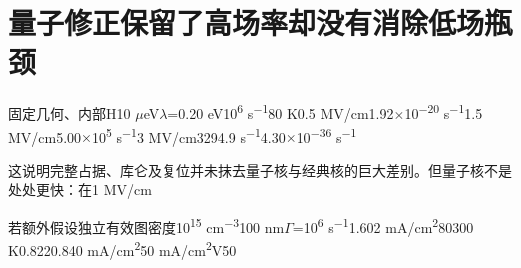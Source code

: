 \section{{\cjkfont 量子修正保留了高场率却没有消除低场瓶颈}\allowbreak{}}\label{sec:44}
{\cjkfont 固定几何、内部}\allowbreak{}H\allowbreak{}10 \ensuremath{\mu}eV\allowbreak{}\ensuremath{\lambda}=\allowbreak{}0.20 eV\allowbreak{}10\textsuperscript{6} s\textsuperscript{−1}\allowbreak{}80 K\allowbreak{}0.5 MV/cm\allowbreak{}1.92\ensuremath{\times}10\textsuperscript{−20} s\textsuperscript{−1}\allowbreak{}1.5 MV/cm\allowbreak{}5.00\ensuremath{\times}10\textsuperscript{5} s\textsuperscript{−1}\allowbreak{}3 MV/cm\allowbreak{}3294.9 s\textsuperscript{−1}\allowbreak{}4.30\ensuremath{\times}10\textsuperscript{−36} s\textsuperscript{−1}\allowbreak{}
\par
{\cjkfont 这说明完整占据、库仑及复位并未抹去量子核与经典核的巨大差别。但量子核不是处处更快：在}\allowbreak{}1 MV/cm\allowbreak{}
\par
{\cjkfont 若额外假设独立有效图密度}\allowbreak{}10\textsuperscript{15} cm\textsuperscript{−3}\allowbreak{}100 nm\allowbreak{}\ensuremath{\Gamma}=\allowbreak{}10\textsuperscript{6} s\textsuperscript{−1}\allowbreak{}1.602 mA/cm\textsuperscript{2}\allowbreak{}80\allowbreak{}300 K\allowbreak{}0.822\allowbreak{}0.840 mA/cm\textsuperscript{2}\allowbreak{}50 mA/cm\textsuperscript{2}\allowbreak{}V50\allowbreak{}
\par
